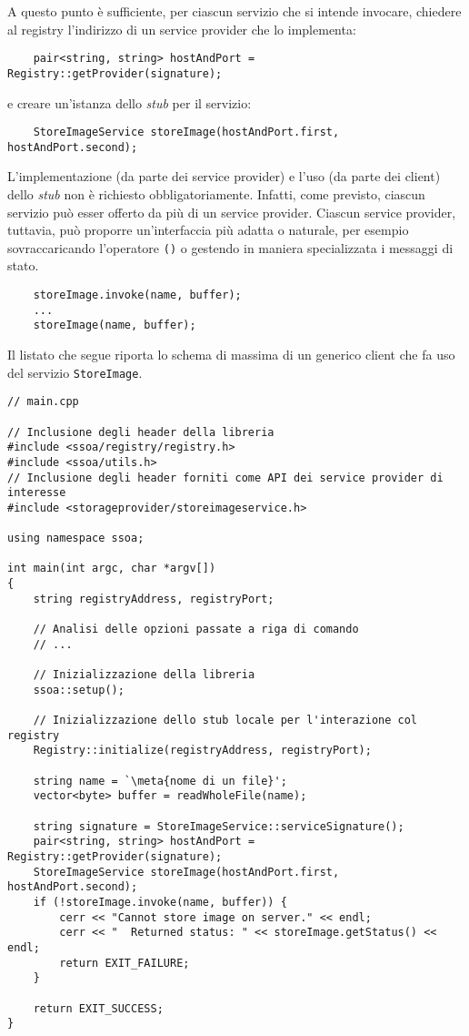 \documentclass[a4paper,twoside]{article}
\newcommand*\meta[1]{$\langle$\emph{#1}$\rangle$}
\newcommand\code{\lstinline[basicstyle=\normalsize\ttfamily]}
\begin{document}
A questo punto è sufficiente, per ciascun servizio che si intende invocare, chiedere al registry l'indirizzo di un service provider che lo implementa:
\begin{lstlisting}
    pair<string, string> hostAndPort = Registry::getProvider(signature);
\end{lstlisting}
e creare un'istanza dello \emph{stub} per il servizio:
\begin{lstlisting}
    StoreImageService storeImage(hostAndPort.first, hostAndPort.second);
\end{lstlisting}

L'implementazione (da parte dei service provider) e l'uso (da parte dei client) dello \emph{stub} non è richiesto obbligatoriamente. Infatti, come previsto, ciascun servizio può esser offerto da più di un service provider. Ciascun service provider, tuttavia, può proporre un'interfaccia più adatta o naturale, per esempio sovraccaricando l'operatore \code|()| o gestendo in maniera specializzata i messaggi di stato.
\begin{lstlisting}
    storeImage.invoke(name, buffer);
    ...
    storeImage(name, buffer);
\end{lstlisting}

Il listato che segue riporta lo schema di massima di un generico client che fa uso del servizio \code|StoreImage|.

\begin{lstlisting}
// main.cpp

// Inclusione degli header della libreria
#include <ssoa/registry/registry.h>
#include <ssoa/utils.h>
// Inclusione degli header forniti come API dei service provider di interesse
#include <storageprovider/storeimageservice.h>

using namespace ssoa;

int main(int argc, char *argv[])
{
    string registryAddress, registryPort;

    // Analisi delle opzioni passate a riga di comando
    // ...

    // Inizializzazione della libreria
    ssoa::setup();

    // Inizializzazione dello stub locale per l'interazione col registry
    Registry::initialize(registryAddress, registryPort);

    string name = `\meta{nome di un file}';
    vector<byte> buffer = readWholeFile(name);

    string signature = StoreImageService::serviceSignature();
    pair<string, string> hostAndPort = Registry::getProvider(signature);
    StoreImageService storeImage(hostAndPort.first, hostAndPort.second);
    if (!storeImage.invoke(name, buffer)) {
        cerr << "Cannot store image on server." << endl;
        cerr << "  Returned status: " << storeImage.getStatus() << endl;
        return EXIT_FAILURE;
    }

    return EXIT_SUCCESS;
}
\end{lstlisting}
\end{document}
